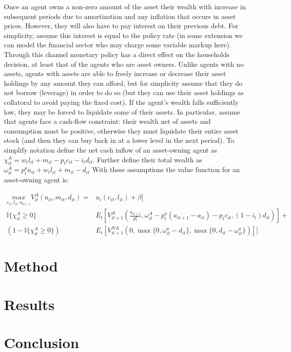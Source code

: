 \documentclass{article}
\begin{document}
Once an agent owns a non-zero amount of the asset their wealth with increase in subsequent periods due to amortization and any inflation that occurs in asset prices. However, they will also have to pay interest on their previous debt. For simplicity, assume this interest is equal to the policy rate (in some extension we can model the financial sector who may charge some variable markup here). Through this channel monetary policy has a direct effect on the households decision, at least that of the agents who are asset owners. Unlike agents with no assets, agents with assets are able to freely increase or decrease their asset holdings by any amount they can afford, but for simplicity assume that they do not borrow (leverage) in order to do so (but they can use their asset holdings as collatoral to avoid paying the fixed cost). If the agent's wealth falls sufficiently low, they may be forced to liquidate some of their assets. In particular, assume that agents face a cash-flow constraint: their wealth net of assets and consumption must be positive, otherwise they must liquidate their entire asset stock (and then they can buy back in at a lower level in the next period). To simplify notation define the net cash inflow of an asset-owning agent as $\chi^A_{it} = w_t l_{it} + m_{it} - p_t c_{it} - i_t d_{it}$. Further define their total wealth as $\omega^A_{it} = p^a_t a_{it} + w_t l_{it} + m_{it} - d_{it}$ With these assumptions the value function for an asset-owning agent is:

\begin{align}
  \underset{c_{it}, l_{it}, a_{it+1}}{max} V^{A}_{it}(a_{it}, m_{it}, d_{it}) = &u_{i}(c_{it}, l_{it}) + \beta [  \nonumber \\ 
  \mathbb{I}\{ \chi^A_{it} \geq 0 \} &E_t[V^A_{it+1}(\frac{a_{it+1}}{p^a_t}, \omega^A_{it} - p^a_t (a_{it+1} - a_{it}) - p_t c_{it}, (1-i_t) d_{it})] + \nonumber \\ 
  \left(1 - \mathbb{I}\{ \chi^A_{it} \geq 0 \} \right) &E_t[V^{NA}_{it+1}(0, \max \{ 0, \omega^a_{it} - d_{it} \}, \max \{ 0, d_{it} - \omega^a_{it} \})]] \label{va}
\end{align}

\section{Method} \label{method}

\section{Results} \label{results}

\section{Conclusion} \label{conclusion}


\newpage
\printbibliography
\end{document}
